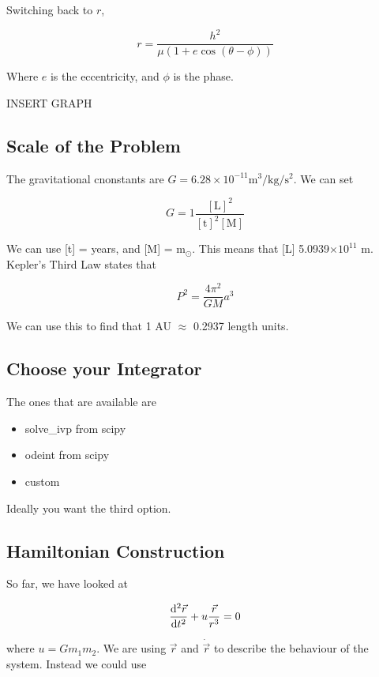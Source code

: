 \documentclass[]{article}
\begin{document}
Switching back to $r$,

\[r = \frac{h^2}{\mu(1+e\cos(\theta - \phi))}\]

Where $e$ is the eccentricity, and $\phi$ is the phase.

INSERT GRAPH

\subsection{Scale of the Problem}\bigbreak

The gravitational cnonstants are $G = 6.28 \times 10^{-11} \text{m}^3/\text{kg}/\text{s}^2$. We can set 

\[G = 1 \frac{[\text{L}]^2}{[\text{t}]^2 [\text{M}]}\] 

We can use [t] = years, and [M] = m$_\odot$. This means that [L]  5.0939$\times 10^11$ m.\\

Kepler's Third Law states that

\[P^2 = \frac{4\pi^2}{GM}a^3\]

We can use this to find that 1 AU $\approx$ 0.2937 length units.\\


\subsection{Choose your Integrator}\bigbreak

The ones that are available are

\begin{itemize}
	\item solve\_ivp from scipy
	\item odeint from scipy
	\item custom
\end{itemize}\bigbreak

Ideally you want the third option.\\



\subsection{Hamiltonian Construction}\bigbreak

So far, we have looked at 

\[\dv[2]{\vec{r}}{t} + u \frac{\vec{r}}{r^3} = 0\]

where $u = Gm_1m_2$. We are using $\vec{r}$ and $\dot{\vec{r}}$ to describe the behaviour of the system. Instead we could use
\end{document}
